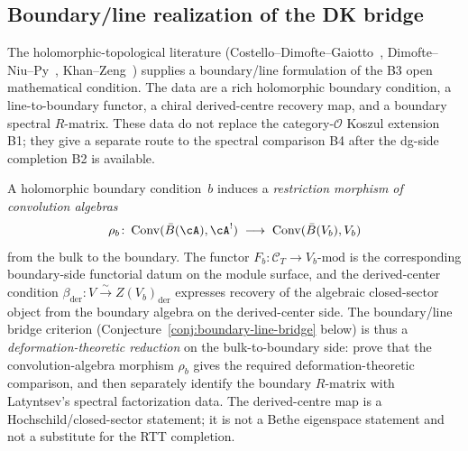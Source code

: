 \subsection{Boundary/line realization of the DK bridge}
\label{subsec:boundary-line-dk-bridge}

The holomorphic-topological literature
(Costello--Dimofte--Gaiotto~\cite{CDG2023},
Dimofte--Niu--Py~\cite{DNP25},
Khan--Zeng~\cite{KZ2025})
supplies a boundary/line formulation of the B3 open mathematical condition.  The
data are a rich holomorphic boundary condition, a line-to-boundary
functor, a chiral derived-centre recovery map, and a boundary spectral
$R$-matrix. These data do not replace the category-$\mathcal{O}$
Koszul extension B1; they give a separate route to the spectral
comparison B4 after the dg-side completion B2 is available.

\smallskip\noindent
A holomorphic boundary condition~$b$ induces a
\emph{restriction morphism of convolution algebras}
\[
\rho_b \colon
\operatorname{Conv}(\bar B(\cA),\cA^!)
\;\longrightarrow\;
\operatorname{Conv}(\bar B(V_b), V_b)
\]
from the bulk to the boundary.
The functor $F_b \colon \mathcal{C}_T \to V_b\text{-mod}$
is the corresponding boundary-side functorial datum on the module
surface,
and the derived-center condition
$\beta_{\mathrm{der}} \colon V \xrightarrow{\sim}
Z(V_b)_{\mathrm{der}}$
expresses recovery of the algebraic closed-sector object from the
boundary algebra on the derived-center side.
The boundary/line bridge criterion
(Conjecture~\ref{conj:boundary-line-bridge} below) is thus a
\emph{deformation-theoretic reduction} on the bulk-to-boundary side:
prove
that the convolution-algebra morphism $\rho_b$ gives the required
deformation-theoretic comparison, and then separately identify the
boundary $R$-matrix with Latyntsev's spectral factorization data.
The derived-centre map is a Hochschild/closed-sector statement; it is not a
Bethe eigenspace statement and not a substitute for the RTT
completion.

